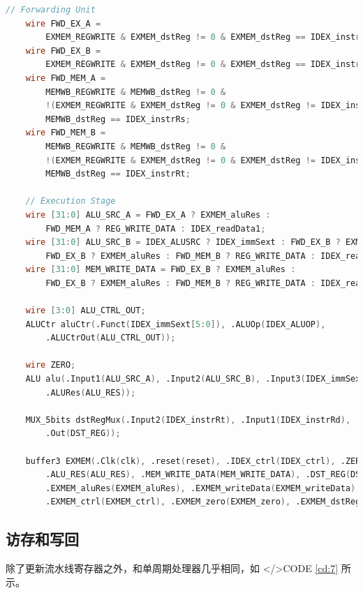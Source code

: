 \documentclass{progartcn}
\begin{document}
\begin{lstlisting}[language=verilog,caption={执行阶段},label={cd:6}]
    // Forwarding Unit
    wire FWD_EX_A = 
        EXMEM_REGWRITE & EXMEM_dstReg != 0 & EXMEM_dstReg == IDEX_instrRs;
    wire FWD_EX_B = 
        EXMEM_REGWRITE & EXMEM_dstReg != 0 & EXMEM_dstReg == IDEX_instrRt;
    wire FWD_MEM_A = 
        MEMWB_REGWRITE & MEMWB_dstReg != 0 & 
        !(EXMEM_REGWRITE & EXMEM_dstReg != 0 & EXMEM_dstReg != IDEX_instrRs) &
        MEMWB_dstReg == IDEX_instrRs;
    wire FWD_MEM_B = 
        MEMWB_REGWRITE & MEMWB_dstReg != 0 & 
        !(EXMEM_REGWRITE & EXMEM_dstReg != 0 & EXMEM_dstReg != IDEX_instrRt) &
        MEMWB_dstReg == IDEX_instrRt;
        
    // Execution Stage
    wire [31:0] ALU_SRC_A = FWD_EX_A ? EXMEM_aluRes : 
        FWD_MEM_A ? REG_WRITE_DATA : IDEX_readData1;
    wire [31:0] ALU_SRC_B = IDEX_ALUSRC ? IDEX_immSext : FWD_EX_B ? EXMEM_aluRes :
        FWD_EX_B ? EXMEM_aluRes : FWD_MEM_B ? REG_WRITE_DATA : IDEX_readData2;
    wire [31:0] MEM_WRITE_DATA = FWD_EX_B ? EXMEM_aluRes :
        FWD_EX_B ? EXMEM_aluRes : FWD_MEM_B ? REG_WRITE_DATA : IDEX_readData2;
         
    wire [3:0] ALU_CTRL_OUT;
    ALUCtr aluCtr(.Funct(IDEX_immSext[5:0]), .ALUOp(IDEX_ALUOP), 
        .ALUCtrOut(ALU_CTRL_OUT));
    
    wire ZERO;
    ALU alu(.Input1(ALU_SRC_A), .Input2(ALU_SRC_B), .Input3(IDEX_immSext[10:6]), .ALUCtr(ALU_CTRL_OUT), .Zero(ZERO),
        .ALURes(ALU_RES));
        
    MUX_5bits dstRegMux(.Input2(IDEX_instrRt), .Input1(IDEX_instrRd), .sel(IDEX_REGDST),
        .Out(DST_REG));
    
    buffer3 EXMEM(.Clk(clk), .reset(reset), .IDEX_ctrl(IDEX_ctrl), .ZERO(ZERO),
        .ALU_RES(ALU_RES), .MEM_WRITE_DATA(MEM_WRITE_DATA), .DST_REG(DST_REG),
        .EXMEM_aluRes(EXMEM_aluRes), .EXMEM_writeData(EXMEM_writeData),
        .EXMEM_ctrl(EXMEM_ctrl), .EXMEM_zero(EXMEM_zero), .EXMEM_dstReg(EXMEM_dstReg));
\end{lstlisting}

\subsection{访存和写回}

除了更新流水线寄存器之外，和单周期处理器几乎相同，如 </>CODE \ref{cd:7} 所示。
\end{document}
